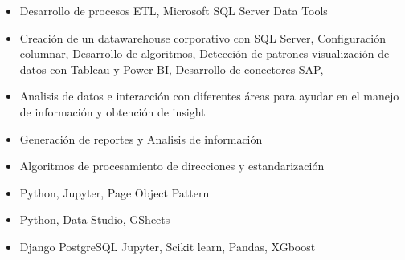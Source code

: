 \documentclass[10pt,a4paper,ragged2e,withhyper]{altacv}
\begin{document}
\begin{paracol}{2}

\begin{itemize}
\item Desarrollo de procesos ETL, Microsoft SQL Server Data Tools
\item Creación de un datawarehouse corporativo con SQL Server, Configuración columnar, Desarrollo de algoritmos, Detección de patrones visualización de datos con Tableau y Power BI, Desarrollo de conectores SAP, 
\item Analisis de datos e interacción con diferentes áreas para ayudar en el manejo de información y obtención de insight
\end{itemize}

\divider

\begin{itemize}
\item Generación de reportes y Analisis de información
\item Algoritmos de procesamiento de direcciones y estandarización
\end{itemize}


\begin{itemize}
	\item Python, Jupyter, Page Object Pattern
\end{itemize}

\divider

\begin{itemize}
	\item Python, Data Studio, GSheets
\end{itemize}

\divider

\begin{itemize}
\item Django PostgreSQL Jupyter, Scikit learn, Pandas, XGboost
\end{itemize}


\end{paracol}
\end{document}
